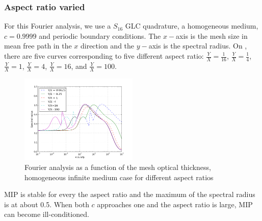 \subsubsection{Aspect ratio varied}
For this Fourier analysis, we use a $S_{16}$ GLC quadrature, a homogeneous
medium, $c=0.9999$ and periodic boundary conditions. The $x-$axis is the mesh
size in mean free path in the $x$ direction and the $y-$axis is the spectral
radius. On , there are five curves corresponding to five
different aspect ratio: $\frac{Y}{X}=\frac{1}{16}$, $\frac{Y}{X}=\frac{1}{4}$,
$\frac{Y}{X}=1$, $\frac{Y}{X}=4$, $\frac{Y}{X}=16$, and $\frac{Y}{X}=100$.
\begin{figure}[H]
  \centering
  \includegraphics[width=0.5\textwidth]{aspect_ratio_9999_2}
  \caption{Fourier analysis as a function of the mesh optical thickness,
  homogeneous infinite medium case for different aspect ratios}
  \label{fig_fa_ar}
\end{figure}
MIP is stable for every the aspect ratio and the maximum of the spectral radius
is at about 0.5. When both $c$ approaches one and the aspect ratio is large,
MIP can become ill-conditioned.

